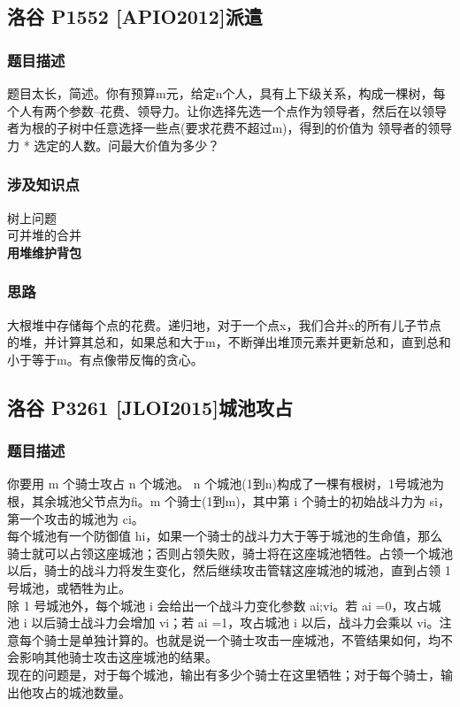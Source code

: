 	\subsection{洛谷 P1552 [APIO2012]派遣}
		\subsubsection{题目描述}
			题目太长，简述。你有预算m元，给定n个人，具有上下级关系，构成一棵树，每个人有两个参数--花费、领导力。让你选择先选一个点作为领导者，然后在以领导者为根的子树中任意选择一些点(要求花费不超过m)，得到的价值为 领导者的领导力 * 选定的人数。问最大价值为多少？
		\subsubsection{涉及知识点}
			树上问题\\
			可并堆的合并\\
			\textbf{用堆维护背包}
		\subsubsection{思路}
			大根堆中存储每个点的花费。递归地，对于一个点x，我们合并x的所有儿子节点的堆，并计算其总和，如果总和大于m，不断弹出堆顶元素并更新总和，直到总和小于等于m。有点像带反悔的贪心。
			
	\subsection{洛谷 P3261 [JLOI2015]城池攻占}
		\subsubsection{题目描述}
			你要用 m 个骑士攻占 n 个城池。 n 个城池(1到n)构成了一棵有根树，1号城池为根，其余城池父节点为fi。m 个骑士(1到m)，其中第 i 个骑士的初始战斗力为 si，第一个攻击的城池为 ci。\\
			每个城池有一个防御值 hi，如果一个骑士的战斗力大于等于城池的生命值，那么骑士就可以占领这座城池；否则占领失败，骑士将在这座城池牺牲。占领一个城池以后，骑士的战斗力将发生变化，然后继续攻击管辖这座城池的城池，直到占领 1 号城池，或牺牲为止。\\
			除 1 号城池外，每个城池 i 会给出一个战斗力变化参数 ai;vi。若 ai =0，攻占城池 i 以后骑士战斗力会增加 vi；若 ai =1，攻占城池 i 以后，战斗力会乘以 vi。注意每个骑士是单独计算的。也就是说一个骑士攻击一座城池，不管结果如何，均不会影响其他骑士攻击这座城池的结果。\\
			现在的问题是，对于每个城池，输出有多少个骑士在这里牺牲；对于每个骑士，输出他攻占的城池数量。
